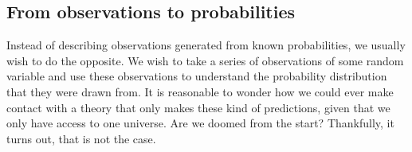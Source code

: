 
\subsection{From observations to probabilities}
    Instead of describing observations generated from known probabilities,
    we usually wish to do the opposite.
    We wish to take a series of observations of some random variable and use these observations
    to understand the probability distribution that they were drawn from.
    It is reasonable to wonder how we could ever make contact with a theory
    that only makes these kind of predictions, given that we only have access to one universe.
    Are we doomed from the start? Thankfully, it turns out, that is not the case.



